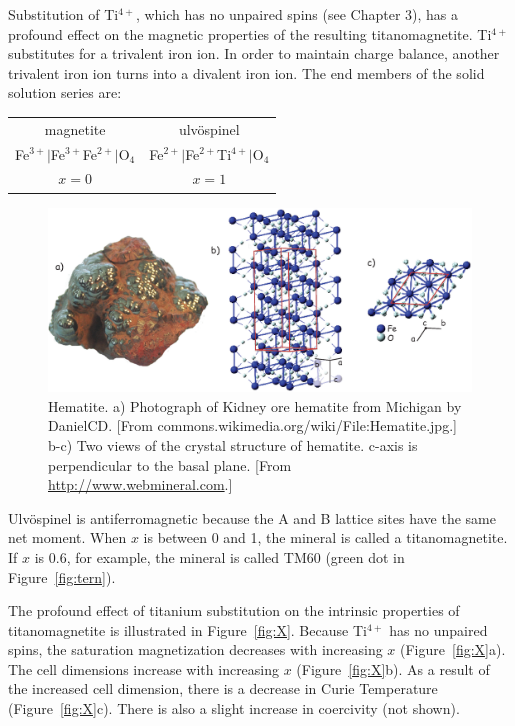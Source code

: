 Substitution of Ti$^{4+}$, which has no unpaired spins (see Chapter 3),
 has a profound effect on the magnetic properties of the
resulting titanomagnetite.  Ti$^{4+}$ substitutes for a trivalent iron ion.
In order to maintain charge balance, another trivalent iron ion turns into a divalent iron
ion.  The end members of the solid solution series are:

\begin{center}
\begin{tabular}{cc}
\hline
 magnetite  &  ulv\"ospinel \\
 Fe$^{3+}|$Fe$^{3+}$Fe$^{2+}|$O$_4$  &  Fe$^{2+}|$Fe$^{2+}$Ti$^{4+}|$O$_4$ \\
 $x = 0 $ &  $x=1$  \\
\hline
\end{tabular}
\end{center}

\begin{figure}[htb]
\centering  \includegraphics[width=14 cm]{EPSfiles/hematite.eps}
\caption{Hematite. a) Photograph of Kidney ore hematite from Michigan by DanielCD. [From commons.wikimedia.org/wiki/File:Hematite.jpg.]   b-c) Two views of the crystal structure of hematite.  c-axis is perpendicular to the basal plane. [From \href{http://www.webmineral.com}{http://www.webmineral.com}.] }
\label{fig:hematite}
\end{figure} 


%
%
Ulv\" ospinel is antiferromagnetic because the A and B lattice sites have the
same net moment.  When $x$ is between 0 and 1, the mineral is called a
titanomagnetite.  If $x$ is 0.6,  for example, the mineral
is called TM60 (green dot in Figure~\ref{fig:tern}).  

%
The profound effect of titanium substitution on the intrinsic properties of titanomagnetite is illustrated in Figure~\ref{fig:X}.  Because Ti$^{4+}$ has no unpaired spins, the saturation magnetization decreases with increasing $x$ (Figure~\ref{fig:X}a).   The cell dimensions increase with increasing $x$ (Figure~\ref{fig:X}b).  As a result of the increased cell dimension, there is a decrease in
 Curie Temperature (Figure~\ref{fig:X}c).  There is also a    slight increase in  coercivity (not shown).  

